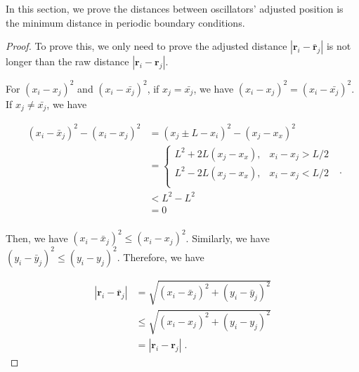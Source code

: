\documentclass[%
 aip,
 amsmath,amssymb,
 reprint,%
]{revtex4-1}
\begin{document}
In this section, we prove the distances between oscillators' adjusted position is the minimum distance in periodic boundary conditions. 

\begin{proof}
    To prove this, we only need to prove the adjusted distance $\left| \mathbf{r}_i-\bar{\mathbf{r}}_j \right|$ is not longer than the raw distance $\left| \mathbf{r}_i-\mathbf{r}_j \right|$.
    
    For $\left( x_i-x_j \right) ^2$ and $\left( x_i-\bar{x_j} \right) ^2$, if $x_j=\bar{x_j}$, we have $\left( x_i-x_j \right) ^2=\left( x_i-\bar{x_j} \right) ^2$. If $x_j\ne \bar{x_j}$, we have

    \begin{equation}
        \begin{aligned}
            \left( x_i-\bar{x}_j \right) ^2-\left( x_i-x_j \right) ^2&=\left( x_j\pm L-x_i \right) ^2-\left( x_j-x_x \right) ^2\\
            &=\begin{cases}
            L^2+2L\left( x_j-x_x \right) ,&		x_i-x_j>L/2\\
            L^2-2L\left( x_j-x_x \right) ,&		x_i-x_j<L/2\\
        \end{cases}\\
            &<L^2-L^2\\
            &=0\\
        \end{aligned}\;.
    \end{equation}

    Then, we have $\left( x_i-\bar{x}_j \right) ^2\leqslant \left( x_i-x_j \right) ^2$. Similarly, we have $\left( y_i-\bar{y}_j \right) ^2\leqslant \left( y_i-y_j \right) ^2$. Therefore, we have 

    \begin{equation}
        \begin{aligned}
            \left| \mathbf{r}_i-\bar{\mathbf{r}}_j \right|&=\sqrt{\left( x_i-\bar{x}_j \right) ^2+\left( y_i-\bar{y}_j \right) ^2}\\
            &\leqslant \sqrt{\left( x_i-x_j \right) ^2+\left( y_i-y_j \right) ^2}\\
            &=\left| \mathbf{r}_i-\mathbf{r}_j \right|\;.
        \end{aligned}
    \end{equation}

\end{proof}
\end{document}
